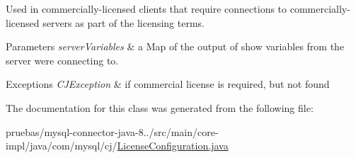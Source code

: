 Used in commercially-\/licensed clients that require connections to commercially-\/licensed servers as part of the licensing terms.


\begin{DoxyParams}{Parameters}
{\em server\+Variables} & a Map of the output of \textquotesingle{}show variables\textquotesingle{} from the server we\textquotesingle{}re connecting to.\\
\hline
\end{DoxyParams}

\begin{DoxyExceptions}{Exceptions}
{\em C\+J\+Exception} & if commercial license is required, but not found \\
\hline
\end{DoxyExceptions}


The documentation for this class was generated from the following file\+:\begin{DoxyCompactItemize}
\item 
pruebas/mysql-\/connector-\/java-\/8../src/main/core-\/impl/java/com/mysql/cj/\mbox{\hyperlink{_license_configuration_8java}{License\+Configuration.\+java}}\end{DoxyCompactItemize}
